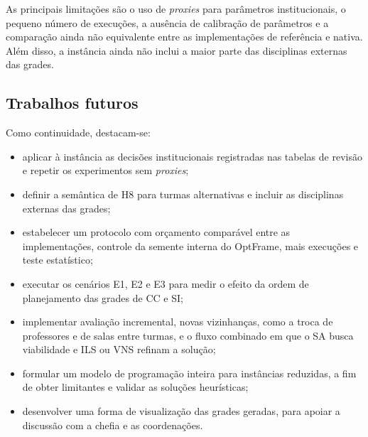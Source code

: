 As principais limitações são o uso de \textit{proxies} para parâmetros institucionais, o pequeno número de execuções, a ausência de calibração de parâmetros e a comparação ainda não equivalente entre as implementações de referência e nativa. Além disso, a instância ainda não inclui a maior parte das disciplinas externas das grades. 

\subsection{Trabalhos futuros}
\label{subsec:trabalhos_futuros}

Como continuidade, destacam-se:
\begin{itemize}
  \item aplicar à instância as decisões institucionais registradas nas tabelas de revisão e repetir os experimentos sem \textit{proxies};
  \item definir a semântica de H8 para turmas alternativas e incluir as disciplinas externas das grades;
  \item estabelecer um protocolo com orçamento comparável entre as implementações, controle da semente interna do OptFrame, mais execuções e teste estatístico;
  \item executar os cenários E1, E2 e E3 para medir o efeito da ordem de planejamento das grades de CC e SI;
  \item implementar avaliação incremental, novas vizinhanças, como a troca de professores e de salas entre turmas, e o fluxo combinado em que o SA busca viabilidade e ILS ou VNS refinam a solução;
  \item formular um modelo de programação inteira para instâncias reduzidas, a fim de obter limitantes e validar as soluções heurísticas;
  \item desenvolver uma forma de visualização das grades geradas, para apoiar a discussão com a chefia e as coordenações.
\end{itemize}
